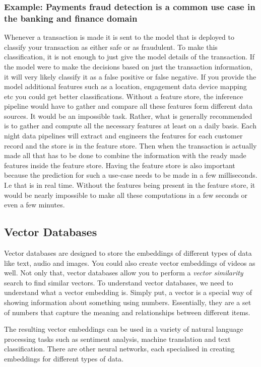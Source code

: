 \subsubsection{Example: Payments fraud detection is a common use case in the banking and finance domain}
Whenever a transaction is made it is sent to the model that is deployed to classify your transaction as either safe or as fraudulent.
To make this classification, it is not enough to just give the model details of the transaction.
If the model were to make the decisions based on just the transaction information, it will very likely classify it as a false positive or false negative.
If you provide the model additional features such as a location, engagement data device mapping etc you could get better classifications.
Without a feature store, the inference pipeline would have to gather and compare all these features form different data sources.
It would be an impossible task.
Rather, what is generally recommended is to gather and compute all the necessary features at least on a daily basis.
Each night data pipelines will extract and engineers the features for each customer record and the store is in the feature store.
Then when the transaction is actually made all that has to be done to combine the information with the ready made features inside the feature store.
Having the feature store is also important because the prediction for such a use-case needs to be made in a few milliseconds.
I.e that is in real time.
Without the features being present in the feature store, it would be nearly impossible to make all these computations in a few seconds or even a few minutes.

\subsection{Vector Databases}
Vector databases are designed to store the embeddings of different types of data like text, audio and images.
You could also create vector embeddings of videos as well.
Not only that, vector databases allow you to perform a \textit{vector similarity} search to find similar vectors.
To understand vector databases, we need to understand what a vector embedding is.
Simply put, a vector is a special way of showing information about something using numbers.
Essentially, they are a set of numbers that capture the meaning and relationships between different items.

The resulting vector embeddings can be used in a variety of natural language processing tasks such as sentiment analysis, machine translation and text classification.
There are other neural networks, each specialised in creating embeddings for different types of data.

